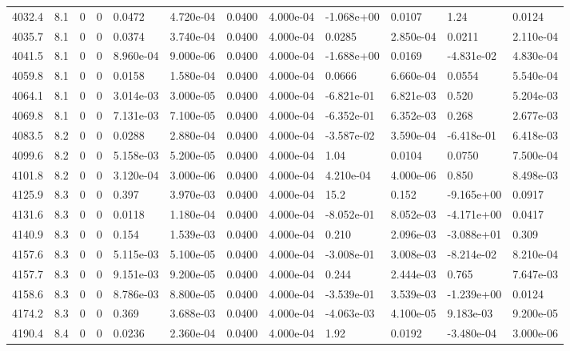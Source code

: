 \documentclass[preview]{standalone}
\begin{document}
{{{{{{{{{{\begin{tabular}{L{1.2cm}C{1.2cm} C{0.3cm}C{0.5cm} C{1.4cm}C{1.4cm} C{1.4cm}C{1.4cm} C{1.6cm}C{1.6cm} C{1.6cm}C{1.6cm}}
  4032.4  &   8.1  & 0     &  0 &  0.0472  & 4.720e-04  &  0.0400&   4.000e-04& -1.068e+00 & 0.0107   &  1.24 & 0.0124  \\ 
  4035.7  &   8.1  & 0     &  0 &  0.0374  & 3.740e-04  &  0.0400&   4.000e-04& 0.0285 & 2.850e-04   &  0.0211 & 2.110e-04  \\ 
  4041.5  &   8.1  & 0     &  0 &  8.960e-04  & 9.000e-06  &  0.0400&   4.000e-04& -1.688e+00 & 0.0169   &  -4.831e-02 & 4.830e-04  \\ 
  4059.8  &   8.1  & 0     &  0 &  0.0158  & 1.580e-04  &  0.0400&   4.000e-04& 0.0666 & 6.660e-04   &  0.0554 & 5.540e-04  \\ 
  4064.1  &   8.1  & 0     &  0 &  3.014e-03  & 3.000e-05  &  0.0400&   4.000e-04& -6.821e-01 & 6.821e-03   &  0.520 & 5.204e-03  \\ 
  4069.8  &   8.1  & 0     &  0 &  7.131e-03  & 7.100e-05  &  0.0400&   4.000e-04& -6.352e-01 & 6.352e-03   &  0.268 & 2.677e-03  \\ 
  4083.5  &   8.2  & 0     &  0 &  0.0288  & 2.880e-04  &  0.0400&   4.000e-04& -3.587e-02 & 3.590e-04   &  -6.418e-01 & 6.418e-03  \\ 
  4099.6  &   8.2  & 0     &  0 &  5.158e-03  & 5.200e-05  &  0.0400&   4.000e-04& 1.04 & 0.0104   &  0.0750 & 7.500e-04  \\ 
  4101.8  &   8.2  & 0     &  0 &  3.120e-04  & 3.000e-06  &  0.0400&   4.000e-04& 4.210e-04 & 4.000e-06   &  0.850 & 8.498e-03  \\ 
  4125.9  &   8.3  & 0     &  0 &  0.397  & 3.970e-03  &  0.0400&   4.000e-04& 15.2 & 0.152   &  -9.165e+00 & 0.0917  \\ 
  4131.6  &   8.3  & 0     &  0 &  0.0118  & 1.180e-04  &  0.0400&   4.000e-04& -8.052e-01 & 8.052e-03   &  -4.171e+00 & 0.0417  \\ 
  4140.9  &   8.3  & 0     &  0 &  0.154  & 1.539e-03  &  0.0400&   4.000e-04& 0.210 & 2.096e-03   &  -3.088e+01 & 0.309  \\ 
  4157.6  &   8.3  & 0     &  0 &  5.115e-03  & 5.100e-05  &  0.0400&   4.000e-04& -3.008e-01 & 3.008e-03   &  -8.214e-02 & 8.210e-04  \\ 
  4157.7  &   8.3  & 0     &  0 &  9.151e-03  & 9.200e-05  &  0.0400&   4.000e-04& 0.244 & 2.444e-03   &  0.765 & 7.647e-03  \\ 
  4158.6  &   8.3  & 0     &  0 &  8.786e-03  & 8.800e-05  &  0.0400&   4.000e-04& -3.539e-01 & 3.539e-03   &  -1.239e+00 & 0.0124  \\ 
  4174.2  &   8.3  & 0     &  0 &  0.369  & 3.688e-03  &  0.0400&   4.000e-04& -4.063e-03 & 4.100e-05   &  9.183e-03 & 9.200e-05  \\ 
  4190.4  &   8.4  & 0     &  0 &  0.0236  & 2.360e-04  &  0.0400&   4.000e-04& 1.92 & 0.0192   &  -3.480e-04 & 3.000e-06  \\ 
\hline 
\end{tabular} 

}}}}}}}}}}
\end{document}
